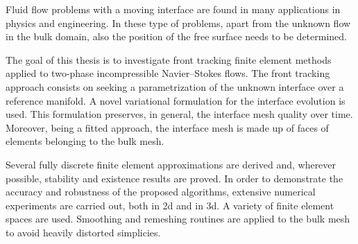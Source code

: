Fluid flow problems with a moving interface are found in many applications in
physics and engineering. In these type of problems, apart from the unknown flow
in the bulk domain, also the position of the free surface needs to be
determined.

The goal of this thesis is to investigate front tracking finite element methods
applied to two-phase incompressible Navier--Stokes flows. The front tracking
approach consists on seeking a parametrization of the unknown interface over a
reference manifold. A novel variational formulation for the interface evolution
is used. This formulation preserves, in general, the interface mesh quality
over time. Moreover, being a fitted approach, the interface mesh is made up of
faces of elements belonging to the bulk mesh.

Several fully discrete finite element approximations are derived and, wherever
possible, stability and existence results are proved. In order to demonstrate
the accuracy and robustness of the proposed algorithms, extensive numerical
experiments are carried out, both in 2d and in 3d. A variety of finite element
spaces are used. Smoothing and remeshing routines are applied to the bulk mesh
to avoid heavily distorted simplicies.

